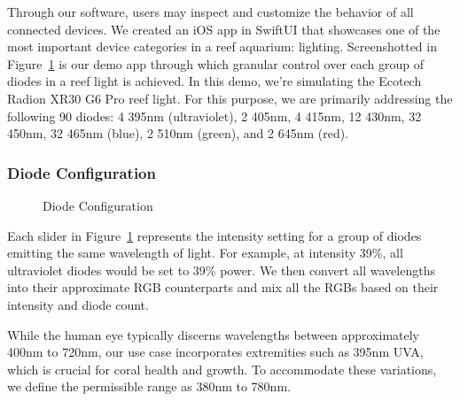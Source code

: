 \documentclass[8pt,twocolumn]{article}
\newcommand{\xssub}[1]{\bigskip\noindent{\small\textbf{#1}}\smallskip}
\begin{document}
Through our software, users may inspect and customize the behavior of all connected devices. We created an iOS app in SwiftUI that showcases one of the most important device categories in a reef aquarium: lighting. Screenshotted in Figure~\ref{fig:diodes} is our demo app through which granular control over each group of diodes in a reef light is achieved. In this demo, we're simulating the Ecotech Radion XR30 G6 Pro reef light. For this purpose, we are primarily addressing the following 90 diodes: 4 395nm (ultraviolet), 2 405nm, 4 415nm, 12 430nm, 32 450nm, 32 465nm (blue), 2 510nm (green), and 2 645nm (red).

\subsubsection{Diode Configuration}

\begin{figure}[!htp]
    \centering
    \caption{Diode Configuration\label{fig:diodes}}
\end{figure}

\noindent Each slider in Figure~\ref{fig:diodes} represents the intensity setting for a group of diodes emitting the same wavelength of light. For example, at intensity 39\%, all ultraviolet diodes would be set to 39\% power. We then convert all wavelengths into their approximate RGB counterparts and mix all the RGBs based on their intensity and diode count. 

\xssub{Wavelength to RGB}

\noindent While the human eye typically discerns wavelengths between approximately 400nm to 720nm, our use case incorporates extremities such as 395nm UVA, which is crucial for coral health and growth. To accommodate these variations, we define the permissible range as 380nm to 780nm.
\end{document}
